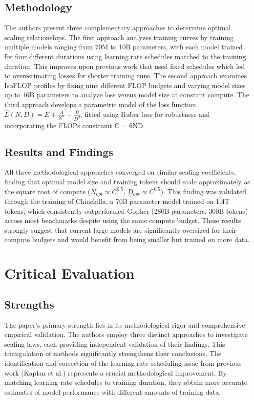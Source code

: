 \documentclass{article}
\begin{document}
\subsection{Methodology}
The authors present three complementary approaches to determine optimal scaling relationships. The first approach analyzes training curves by training multiple models ranging from 70M to 10B parameters, with each model trained for four different durations using learning rate schedules matched to the training duration. This improves upon previous work that used fixed schedules which led to overestimating losses for shorter training runs. The second approach examines IsoFLOP profiles by fixing nine different FLOP budgets and varying model sizes up to 16B parameters to analyze loss versus model size at constant compute. The third approach develops a parametric model of the loss function $\hat{L}(N,D) = E + \frac{A}{N^\alpha} + \frac{B}{D^\beta}$, fitted using Huber loss for robustness and incorporating the FLOPs constraint C = 6ND.

\subsection{Results and Findings}
All three methodological approaches converged on similar scaling coefficients, finding that optimal model size and training tokens should scale approximately as the square root of compute ($N_{opt} \propto C^{0.5}$, $D_{opt} \propto C^{0.5}$). This finding was validated through the training of Chinchilla, a 70B parameter model trained on 1.4T tokens, which consistently outperformed Gopher (280B parameters, 300B tokens) across most benchmarks despite using the same compute budget. These results strongly suggest that current large models are significantly oversized for their compute budgets and would benefit from being smaller but trained on more data.

\section{Critical Evaluation}

\subsection{Strengths}
The paper's primary strength lies in its methodological rigor and comprehensive empirical validation. The authors employ three distinct approaches to investigate scaling laws, each providing independent validation of their findings. This triangulation of methods significantly strengthens their conclusions. The identification and correction of the learning rate scheduling issue from previous work (Kaplan et al.) represents a crucial methodological improvement. By matching learning rate schedules to training duration, they obtain more accurate estimates of model performance with different amounts of training data.
\end{document}
